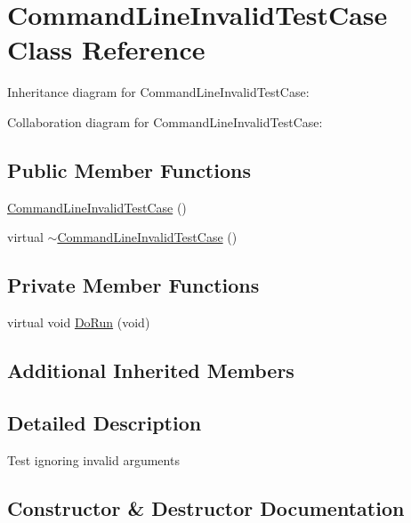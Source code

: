 \hypertarget{classCommandLineInvalidTestCase}{}\section{Command\+Line\+Invalid\+Test\+Case Class Reference}
\label{classCommandLineInvalidTestCase}


Inheritance diagram for Command\+Line\+Invalid\+Test\+Case\+:


Collaboration diagram for Command\+Line\+Invalid\+Test\+Case\+:
\subsection*{Public Member Functions}
\begin{DoxyCompactItemize}
\item 
\hyperlink{classCommandLineInvalidTestCase_ac27e5dd806bbd9f2f37ab6ae39a5a199}{Command\+Line\+Invalid\+Test\+Case} ()
\item 
virtual \hyperlink{classCommandLineInvalidTestCase_a221fb678144e817ee4032d1167a90df8}{$\sim$\+Command\+Line\+Invalid\+Test\+Case} ()
\end{DoxyCompactItemize}
\subsection*{Private Member Functions}
\begin{DoxyCompactItemize}
\item 
virtual void \hyperlink{classCommandLineInvalidTestCase_aef2670fed09593732b8169290ac05897}{Do\+Run} (void)
\end{DoxyCompactItemize}
\subsection*{Additional Inherited Members}


\subsection{Detailed Description}
Test ignoring invalid arguments 

\subsection{Constructor \& Destructor Documentation}
